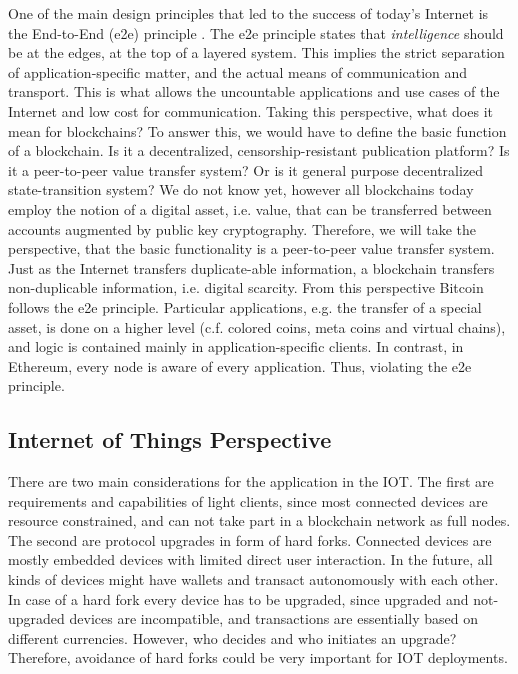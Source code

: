 One of the main design principles that led to the success of today's Internet is the End-to-End (e2e) principle \parencite{Saltzer:1984:EAS:357401.357402}. The e2e principle states that \emph{intelligence} should be at the edges, at the top of a layered system. This implies the strict separation of application-specific matter, and the actual means of communication and transport. This is what allows the uncountable applications and use cases of the Internet and low cost for communication. Taking this perspective, what does it mean for blockchains? To answer this, we would have to define the basic function of a blockchain. Is it a decentralized, censorship-resistant publication platform? Is it a peer-to-peer value transfer system? Or is it general purpose decentralized state-transition system? We do not know yet, however all blockchains today employ the notion of a digital asset, i.e. value, that can be transferred between accounts augmented by public key cryptography. Therefore, we will take the perspective, that the basic functionality is a peer-to-peer value transfer system. Just as the Internet transfers duplicate-able information, a blockchain transfers non-duplicable information, i.e. digital scarcity. From this perspective Bitcoin follows the e2e principle. Particular applications, e.g. the transfer of a special asset, is done on a higher level (c.f. colored coins, meta coins and virtual chains), and logic is contained mainly in application-specific clients. In contrast, in Ethereum, every node is aware of every application. Thus, violating the e2e principle.


\subsection*{Internet of Things Perspective}

There are two main considerations for the application in the \ac{IOT}. The first are requirements and capabilities of light clients, since most connected devices are resource constrained, and can not take part in a blockchain network as full nodes. The second are protocol upgrades in form of hard forks. Connected devices are mostly embedded devices with limited direct user interaction. In the future, all kinds of devices might have wallets and transact autonomously with each other. In case of a hard fork every device has to be upgraded, since upgraded and not-upgraded devices are incompatible, and transactions are essentially based on different currencies. However, who decides and who initiates an upgrade? Therefore, avoidance of hard forks could be very important for \ac{IOT} deployments.

